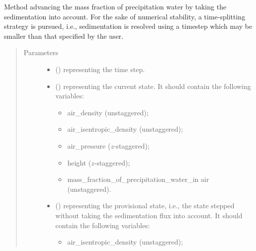 \documentclass[letterpaper,10pt,english]{sphinxmanual}
\begin{document}
\begin{fulllineitems}
\begin{fulllineitems}
\end{fulllineitems}


\begin{fulllineitems}
\label{\detokenize{api:dycore.prognostic_isentropic_centered.PrognosticIsentropicCentered.step_integrating_sedimentation_flux}}
Method advancing the mass fraction of precipitation water by taking the sedimentation into account.
For the sake of numerical stability, a time-splitting strategy is pursued, i.e., sedimentation is resolved
using a timestep which may be smaller than that specified by the user.
\begin{quote}\begin{description}
\item[{Parameters}] \leavevmode\begin{itemize}
\item {} 
 () \textendash{}  representing the time step.

\item {} 
 () \textendash{} 
 representing the current state.
It should contain the following variables:
\begin{itemize}
\item {} 
air\_density (unstaggered);

\item {} 
air\_isentropic\_density (unstaggered);

\item {} 
air\_pressure (\(z\)-staggered);

\item {} 
height (\(z\)-staggered);

\item {} 
mass\_fraction\_of\_precipitation\_water\_in air (unstaggered).

\end{itemize}


\item {} 
 () \textendash{} 
 representing the provisional state, i.e.,
the state stepped without taking the sedimentation flux into account.
It should contain the following variables:
\begin{itemize}
\item {} 
air\_isentropic\_density (unstaggered);


\end{itemize}
\end{itemize}
\end{description}
\end{quote}
\end{fulllineitems}
\end{fulllineitems}
\end{document}
